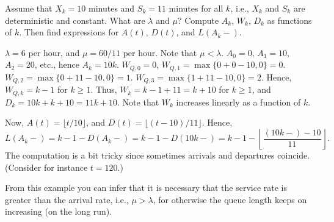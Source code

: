 \begin{extra}\label{ex:25}
 Assume that $X_k = 10$ minutes and $S_k = 11$ minutes for all
    $k$, i.e., $X_k$ and $S_k$ are deterministic and constant. What
    are $\lambda$ and $\mu$?  Compute $A_k$, $W_k$, $D_k$ as functions of $k$. Then find expressions for $A(t)$, $D(t)$, and  $L(A_k-)$. 
  \begin{solution}
 $\lambda=6$ per hour, and $\mu=60/11$ per hour. Note that
      $\mu < \lambda$. $A_0 = 0$, $A_1=10$, $A_2=20$, etc., hence
      $A_k = 10k$. $W_{Q,0} = 0$, $W_{Q,1} = \max\{0 + 0-10,0\} = 0$.
      $W_{Q,2} = \max\{0+11-10,0\} =1$.
      $W_{Q,3} = \max\{1+11-10,0\} =2$. Hence, $W_{Q,k} = k-1$ for
      $k\geq1$. Thus, $W_k = k-1+11 = k + 10$ for $k\geq1$, and
      $D_k = 10k + k+10 = 11k+10$. Note that $W_k$ increases linearly
      as a function of $k$.

      Now, $A(t) = \lfloor t/10\rfloor$, and $D(t) = \lfloor (t-10)/11 \rfloor$. Hence,
      \begin{equation*}
      L(A_k-) = k-1 - D(A_k-) = k- 1 - D(10k-) = k- 1 - \left \lfloor \frac{(10k-)-10}{11} \right \rfloor.
      \end{equation*}
      The computation is a bit tricky since sometimes  arrivals  and  departures coincide. (Consider for instance $t=120$.)

From this example you can infer that it is necessary that the service rate is greater than the arrival rate, i.e.,  $\mu > \lambda$,  for otherwise the queue length keeps on increasing (on the long run).
  \end{solution}
\end{extra}


